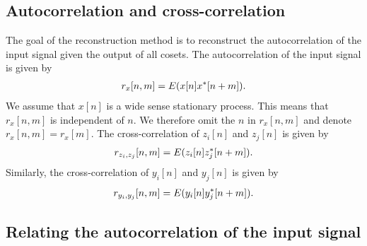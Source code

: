 \documentclass[a4paper, openany, oneside]{memoir}
\begin{document}
\subsection{Autocorrelation and cross-correlation}
The goal of the reconstruction method is to reconstruct the autocorrelation of the input signal given the output of all cosets. The autocorrelation of the input signal is given by
\begin{align*}
    r_x[n,m] = E(x[n]x^*[n+m]).
\end{align*}
We assume that $x[n]$ is a wide sense stationary process. This means that $r_x[n,m]$ is independent of $n$. We therefore omit the $n$ in $r_x[n,m]$ and denote $r_x[n,m]=r_x[m]$. The cross-correlation of $z_i[n]$ and $z_j[n]$ is given by
\begin{align*}
    r_{z_i,z_j}[n,m]=E(z_i[n]z^*_j[n+m]).
\end{align*}
Similarly, the cross-correlation of $y_i[n]$ and $y_j[n]$ is given by
\begin{align*}
    r_{y_i,y_j}[n,m]=E(y_i[n]y^*_j[n+m]).
\end{align*}

\subsection{Relating the autocorrelation of the input signal}
\end{document}
